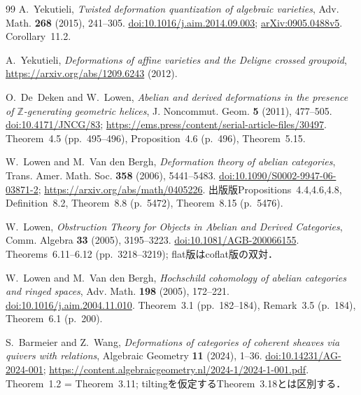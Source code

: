 \documentclass[11pt,a4paper]{ltjsarticle}
\numberwithin{equation}{section}
\begin{document}
\begin{thebibliography}{99}
A.~Yekutieli,
\emph{Twisted deformation quantization of algebraic varieties},
Adv. Math. \textbf{268} (2015), 241--305.
\href{https://doi.org/10.1016/j.aim.2014.09.003}{doi:10.1016/j.aim.2014.09.003};
\href{https://arxiv.org/abs/0905.0488v5}{arXiv:0905.0488v5}.
Corollary~11.2.

A.~Yekutieli,
\emph{Deformations of affine varieties and the Deligne crossed groupoid},
\url{https://arxiv.org/abs/1209.6243} (2012).

O.~De~Deken and W.~Lowen,
\emph{Abelian and derived deformations in the presence of
$\mathbb Z$-generating geometric helices},
J. Noncommut. Geom. \textbf{5} (2011), 477--505.
\href{https://doi.org/10.4171/JNCG/83}{doi:10.4171/JNCG/83};
\url{https://ems.press/content/serial-article-files/30497}.
Theorem~4.5 (pp.~495--496), Proposition~4.6 (p.~496), Theorem~5.15.

W.~Lowen and M.~Van den Bergh,
\emph{Deformation theory of abelian categories},
Trans. Amer. Math. Soc. \textbf{358} (2006), 5441--5483.
\href{https://doi.org/10.1090/S0002-9947-06-03871-2}{doi:10.1090/S0002-9947-06-03871-2};
\url{https://arxiv.org/abs/math/0405226}.
出版版Propositions~4.4,4.6,4.8, Definition~8.2,
Theorem~8.8 (p.~5472), Theorem~8.15 (p.~5476).

W.~Lowen,
\emph{Obstruction Theory for Objects in Abelian and Derived Categories},
Comm. Algebra \textbf{33} (2005), 3195--3223.
\href{https://doi.org/10.1081/AGB-200066155}{doi:10.1081/AGB-200066155}.
Theorems~6.11--6.12 (pp.~3218--3219); flat版はcoflat版の双対．

W.~Lowen and M.~Van den Bergh,
\emph{Hochschild cohomology of abelian categories and ringed spaces},
Adv. Math. \textbf{198} (2005), 172--221.
\href{https://doi.org/10.1016/j.aim.2004.11.010}{doi:10.1016/j.aim.2004.11.010}.
Theorem~3.1 (pp.~182--184), Remark~3.5 (p.~184), Theorem~6.1 (p.~200).

S.~Barmeier and Z.~Wang,
\emph{Deformations of categories of coherent sheaves via quivers with relations},
Algebraic Geometry \textbf{11} (2024), 1--36.
\href{https://doi.org/10.14231/AG-2024-001}{doi:10.14231/AG-2024-001};
\url{https://content.algebraicgeometry.nl/2024-1/2024-1-001.pdf}.
Theorem~1.2 = Theorem~3.11; tiltingを仮定するTheorem~3.18とは区別する．


\end{thebibliography}
\end{document}
